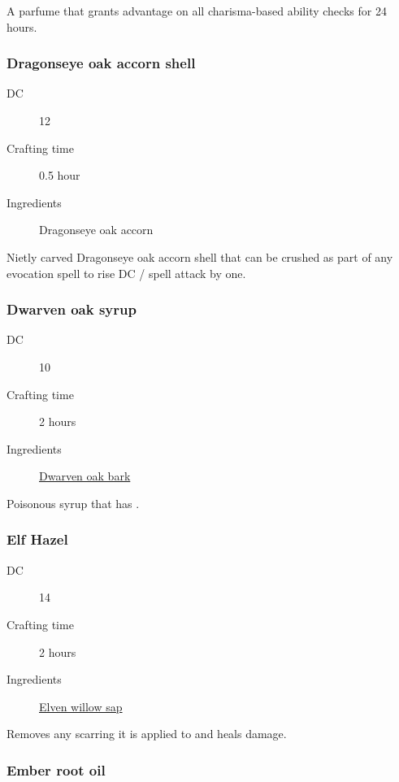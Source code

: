 A parfume that grants advantage on all charisma-based ability checks for 24 hours.

\subsubsection{Dragonseye oak accorn shell}
\label{Dragonseye oak accorn shell}

\begin{description}
\item [DC] 12
\item [Crafting time] 0.5 hour
\item [Ingredients] Dragonseye oak accorn
\end{description}

Nietly carved Dragonseye oak accorn shell that can be crushed as part of any evocation spell to rise DC / spell attack by one.

\subsubsection{Dwarven oak syrup}
\label{Dwarven oak syrup}

\begin{description}
\item [DC] 10
\item [Crafting time] 2 hours
\item [Ingredients] \hyperref[Dwarven Oak]{Dwarven oak bark}
\end{description}

Poisonous syrup that has \poison\poison\poison.

\subsubsection{Elf Hazel}
\label{Elf Hazel}

\begin{description}
\item [DC] 14
\item [Crafting time] 2 hours
\item [Ingredients] \hyperref[Elven Willow]{Elven willow sap}
\end{description}

Removes any scarring it is applied to and heals  damage.

\subsubsection{Ember root oil}
\label{Ember root oil}

